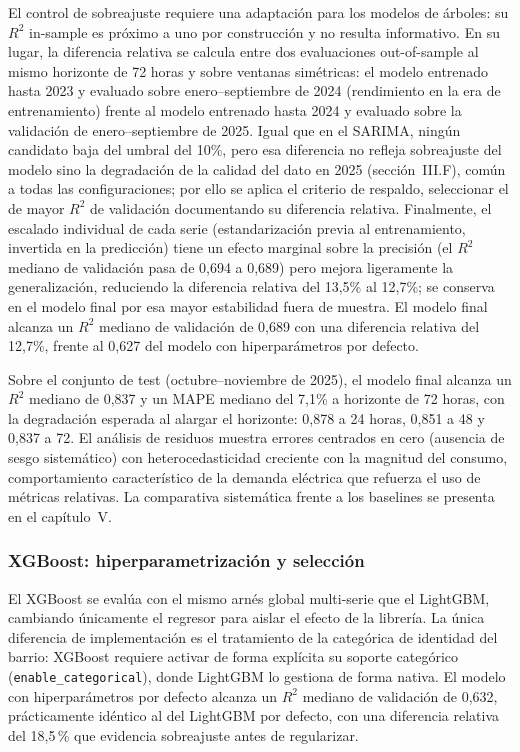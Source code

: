 \documentclass[12pt, a4paper]{article}
\begin{document}
El control de sobreajuste requiere una adaptación para los modelos de árboles: su $R^2$ in-sample es próximo a uno por construcción y no resulta informativo. En su lugar, la diferencia relativa se calcula entre dos evaluaciones out-of-sample al mismo horizonte de 72 horas y sobre ventanas simétricas: el modelo entrenado hasta 2023 y evaluado sobre enero--septiembre de 2024 (rendimiento en la era de entrenamiento) frente al modelo entrenado hasta 2024 y evaluado sobre la validación de enero--septiembre de 2025. Igual que en el SARIMA, ningún candidato baja del umbral del 10\%, pero esa diferencia no refleja sobreajuste del modelo sino la degradación de la calidad del dato en 2025 (sección~III.F), común a todas las configuraciones; por ello se aplica el criterio de respaldo, seleccionar el de mayor $R^2$ de validación documentando su diferencia relativa. Finalmente, el escalado individual de cada serie (estandarización previa al entrenamiento, invertida en la predicción) tiene un efecto marginal sobre la precisión (el $R^2$ mediano de validación pasa de 0,694 a 0,689) pero mejora ligeramente la generalización, reduciendo la diferencia relativa del 13,5\% al 12,7\%; se conserva en el modelo final por esa mayor estabilidad fuera de muestra. El modelo final alcanza un $R^2$ mediano de validación de 0,689 con una diferencia relativa del 12,7\%, frente al 0,627 del modelo con hiperparámetros por defecto.

Sobre el conjunto de test (octubre--noviembre de 2025), el modelo final alcanza un $R^2$ mediano de 0,837 y un MAPE mediano del 7,1\% a horizonte de 72 horas, con la degradación esperada al alargar el horizonte: 0,878 a 24 horas, 0,851 a 48 y 0,837 a 72. El análisis de residuos muestra errores centrados en cero (ausencia de sesgo sistemático) con heterocedasticidad creciente con la magnitud del consumo, comportamiento característico de la demanda eléctrica que refuerza el uso de métricas relativas. La comparativa sistemática frente a los baselines se presenta en el capítulo~V.

\subsubsection{XGBoost: hiperparametrización y selección}

El XGBoost se evalúa con el mismo arnés global multi-serie que el LightGBM, cambiando únicamente el regresor para aislar el efecto de la librería. La única diferencia de implementación es el tratamiento de la categórica de identidad del barrio: XGBoost requiere activar de forma explícita su soporte categórico (\texttt{enable\_categorical}), donde LightGBM lo gestiona de forma nativa. El modelo con hiperparámetros por defecto alcanza un $R^2$ mediano de validación de 0,632, prácticamente idéntico al del LightGBM por defecto, con una diferencia relativa del 18,5\,\% que evidencia sobreajuste antes de regularizar.
\end{document}
